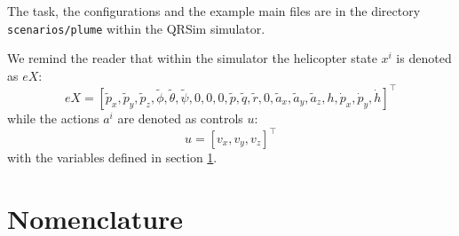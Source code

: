 \documentclass[a4paper,11pt]{report}
\newcommand{\sname}{QRSim\xspace}
\newcommand\mytexttt[1]{\texttt{\hyphenchar\font=45\relax #1}}
\begin{document}
The task, the configurations and the example main files are in the directory \mytexttt{scenarios/plume} within the \sname simulator. 

We remind the reader that within the simulator the helicopter state $x^i$ is denoted as $eX$:
$$eX = [\tilde{p}_x,\tilde{p}_y,\tilde{p}_z,\tilde{\phi},\tilde{\theta},\tilde{\psi},0,0,0,\tilde{p},\tilde{q},\tilde{r},0,\tilde{a}_x,\tilde{a}_y,\tilde{a}_z,h,\dot{p}_x,\dot{p}_y,\dot{h}]^\intercal$$
while the actions $a^i$ are denoted as controls $u$:
$$u=[v_x,v_y,v_z]^\intercal$$
with the variables defined in section \ref{tab:naming}.

\newpage

\appendix

\chapter{Nomenclature}\label{tab:naming}
\end{document}
